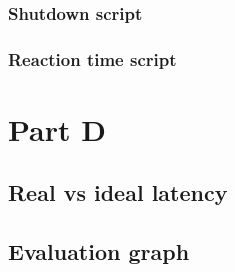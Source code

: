 \documentclass[paper=a4, fontsize=11pt]{scrartcl} %
\numberwithin{equation}{section} %
\numberwithin{figure}{section} %
\numberwithin{table}{section} %
\begin{document}
\subsubsection{Shutdown script}

\subsubsection{Reaction time script}

\section{Part D}


\subsection{Real vs ideal latency}



\subsection{Evaluation graph}
\end{document}
